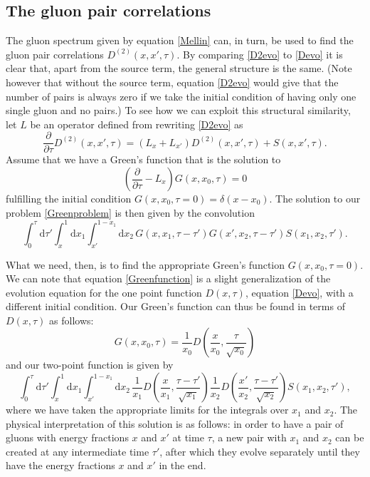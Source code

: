 \documentclass[a4paper,12pt]{article}
\newcommand{\party}[2]{\frac{\partial{#1}}{\partial{#2}}}
\numberwithin{equation}{section}
\begin{document}
\subsection{The gluon pair correlations}
The gluon spectrum given by equation \eqref{Mellin} can, in turn, be used to find the gluon pair correlations $D^{(2)}(x,x',\tau)$. By comparing \eqref{D2evo} to \eqref{Devo} it is clear that, apart from the source term, the general structure is the same. (Note however that without the source term, equation \eqref{D2evo} would give that the number of pairs is always zero if we take the initial condition of having only one single gluon and no pairs.) To see how we can exploit this structural similarity, let $L$ be an operator defined from rewriting \eqref{D2evo} as
\begin{equation}\label{Greenproblem}
\party{}{\tau}D^{(2)}(x,x',\tau) = (L_x + L_{x'})D^{(2)}(x,x',\tau)+S(x,x',\tau).
\end{equation}
Assume that we have a Green's function that is the solution to
\begin{equation}\label{Greenfunction}
\left(\party{}{\tau}- L_x\right)G(x,x_0,\tau)=0
\end{equation}
fulfilling the initial condition $G(x,x_0,\tau=0)=\delta(x-x_0)$. The solution to our problem \eqref{Greenproblem} is then given by the convolution
\begin{equation}
\int_0^\tau \mathrm{d}\tau' \int_x^1 \mathrm{d}x_1 \int_{x'}^{1-x_1} \mathrm{d}x_2\, G(x,x_1,\tau-\tau') G(x',x_2,\tau-\tau') S(x_1,x_2,\tau').
\end{equation}


What we need, then, is to find the appropriate Green's function $G(x,x_0,\tau=0)$. We can note that equation \eqref{Greenfunction} is a slight generalization of the evolution equation for the one point function $D(x,\tau)$, equation \eqref{Devo}, with a different initial condition. Our Green's function can thus be found in terms of $D(x,\tau)$ as follows:
\begin{equation}
G(x,x_0,\tau) = \frac{1}{x_0} D\left(\frac{x}{x_0},\frac{\tau}{\sqrt{x_0}}\right)
\end{equation}
and our two-point function is given by 
\begin{equation}\label{D2}
\int_0^\tau \mathrm{d}\tau' \int_x^1 \mathrm{d}x_1 \int_{x'}^{1-x_1} \mathrm{d}x_2\, 
\frac{1}{x_1} D\left(\frac{x}{x_1},\frac{\tau-\tau'}{\sqrt{x_1}}\right)
\frac{1}{x_2} D\left(\frac{x'}{x_2},\frac{\tau-\tau'}{\sqrt{x_2}}\right)
S(x_1,x_2,\tau'),
\end{equation}
where we have taken the appropriate limits for the integrals over $x_1$ and $x_2$. The physical interpretation of this solution is as follows: in order to have a pair of gluons with energy fractions $x$ and $x'$ at time $\tau$, a new pair with $x_1$ and $x_2$ can be created at any intermediate time $\tau'$, after which they evolve separately until they have the energy fractions $x$ and $x'$ in the end. 
\end{document}
